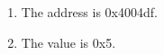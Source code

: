 \documentclass{article}
\begin{document}
\begin{enumerate}[label=\textbf{\Alph*.}]
	\item The address is 0x4004df.
	\item The value is 0x5.
\end{enumerate}
\end{document}
